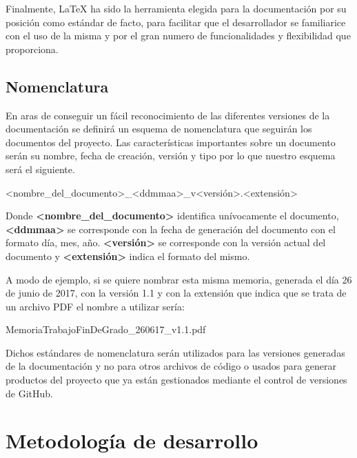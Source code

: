 \bigskip

Finalmente, LaTeX ha sido la herramienta elegida para la documentación por su posición como estándar de facto, para facilitar que el desarrollador se familiarice con el uso de la misma y por el gran numero de funcionalidades y flexibilidad que proporciona.

\subsection{Nomenclatura}

En aras de conseguir un fácil reconocimiento de las diferentes versiones de la documentación se definirá un esquema de nomenclatura que seguirán los documentos del proyecto. Las características importantes sobre un documento serán su nombre, fecha de creación, versión y tipo por lo que nuestro esquema será el siguiente.

\begin{center}
	\textless nombre\_del\_documento\textgreater \_\textless ddmmaa\textgreater \_v\textless versión\textgreater .\textless extensión\textgreater 
\end{center}

Donde \textbf{\textless nombre\_del\_documento\textgreater } identifica unívocamente el documento, \textbf{\textless ddmmaa\textgreater } se corresponde con la fecha de generación del documento con el formato día, mes, año. \textbf{\textless versión\textgreater } se corresponde con la versión actual del documento y \textbf{\textless extensión\textgreater } indica el formato del mismo.

\bigskip

A modo de ejemplo, si se quiere nombrar esta misma memoria, generada el día 26 de junio de 2017, con la versión 1.1 y con la extensión que indica que se trata de un archivo PDF el nombre a utilizar sería:

\begin{center}
	MemoriaTrabajoFinDeGrado\_260617\_v1.1.pdf
\end{center}


Dichos estándares de nomenclatura serán utilizados para las versiones generadas de la documentación y no para otros archivos de código o usados para generar productos del proyecto que ya están gestionados mediante el control de versiones de GitHub.

\section{Metodología de desarrollo}

